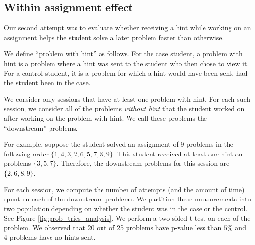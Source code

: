 \documentclass{llncs2e/llncs}
\begin{document}

\subsection{Within assignment effect}

Our second attempt was to evaluate whether receiving a hint while working on an assignment helps the student solve a later problem faster than otherwise.

We define ``problem with hint'' as follows. For the case student, a
problem with hint is a problem where a hint was sent to the student who then chose to view it. For a control student, it is a problem for which a hint would have been sent, had the student been in the case.

We consider only sessions that have at least one problem with
hint. For each such session, we consider all of the problems {\em
  without hint} that the student worked on after working on the
problem with hint. We call these problems the ``downstream'' problems.

For example, suppose the student solved an assignment of 9 problems in the following order $\{ 1, 4, 3, 2, 6, 5, 7, 8, 9\}$. This student received at least one hint on problems $\{3, 5, 7\}$. Therefore, the downstream problems for this session are $\{2, 6, 8, 9\}$.

For each session, we compute the number of attempts (and the amount of time) spent on each of the downstream problems. We partition these measurements into two population depending on whether the student was in the case or the control. See Figure \ref{fig:prob_tries_analysis}. We perform a two sided t-test on each of the problem. We observed that 20 out of 25 problems have p-value less than $5\%$ and 4 problems have no hints sent.
\end{document}
